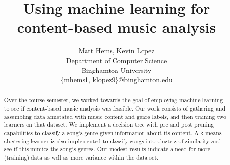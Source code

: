 \documentclass[11pt, twocolumn]{article}
\begin{document}
\title{Using machine learning for content-based music analysis}
\author{Matt Hems, Kevin Lopez\\
  Department of Computer Science\\
  Binghamton University\\
\{mhems1, klopez9\}@binghamton.edu}
\maketitle

\begin{abstract}
Over the course semester, we worked towards the goal of employing machine
learning to see if content-based music analysis was feasible. Our work consists
of gathering and assembling data annotated with music content and genre labels,
and then training two learners on that dataset. We implement a decision tree
with pre and post pruning capabilities to classify a song’s genre given
information about its content. A k-means clustering learner is also implemented
to classify songs into clusters of similarity and see if this mimics the
song’s genres. Our modest results indicate a need for more (training) data as
well as more variance within the data set.
\end{abstract}
\end{document}
